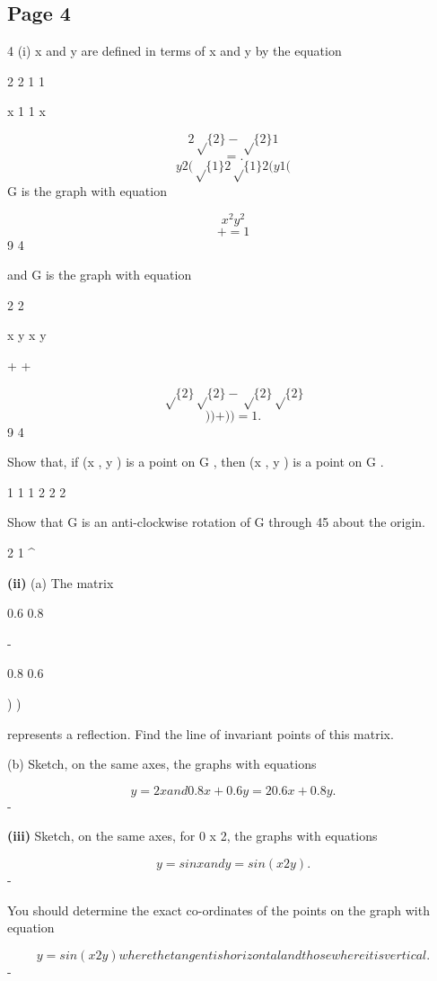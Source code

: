 \documentclass[12pt]{article}
\begin{document}
\subsection*{Page 4}
\begin{flushleft}
4 (i) x and y are defined in terms of x and y by the equation\par
2 2 1 1\par
x 1 1 x\par
\[2 \sqrt\{2\} - \sqrt\{2\} 1\]
\[= .\]
\[y 2 (  \sqrt\{1\} 2 \sqrt\{1\} 2 (  y 1 (\]
G is the graph with equation\par
\[x^2 y^2\]
\[+ = 1\]
9 4\par
and G is the graph with equation\par
2 2\par
x y x y\par
+ +\par
\[\sqrt\{2\} \sqrt\{2\} - \sqrt\{2\} \sqrt\{2\}\]
\[) ) + ) ) = 1.\]
9 4\par
Show that, if (x , y ) is a point on G , then (x , y ) is a point on G .\par
1 1 1 2 2 2\par
Show that G is an anti-clockwise rotation of G through 45 about the origin.\par
2 1 \textasciicircum{}\circ\par
\textbf{(ii)} (a) The matrix\par
0.6 0.8\par
-\par
0.8 0.6\par
) )\par
represents a reflection. Find the line of invariant points of this matrix.\par
(b) Sketch, on the same axes, the graphs with equations\par
\[y = 2x and 0.8x + 0.6y = 2 0.6x+0.8y.\]
-\par
\textbf{(iii)} Sketch, on the same axes, for 0  x  2\pi, the graphs with equations\par
\[y = sin x and y = sin(x 2y).\]
-\par
You should determine the exact co-ordinates of the points on the graph with equation\par
\[y = sin(x 2y) where the tangent is horizontal and those where it is vertical.\]
-\par
\end{flushleft}
\end{document}
